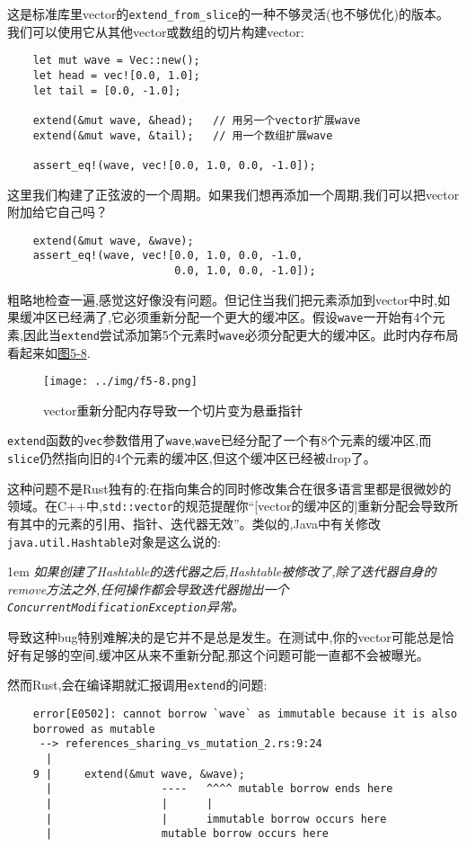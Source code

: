 这是标准库里vector的\texttt{extend\_from\_slice}的一种不够灵活(也不够优化)的版本。我们可以使用它从其他vector或数组的切片构建vector:
\begin{verbatim}
    let mut wave = Vec::new();
    let head = vec![0.0, 1.0];
    let tail = [0.0, -1.0];

    extend(&mut wave, &head);   // 用另一个vector扩展wave
    extend(&mut wave, &tail);   // 用一个数组扩展wave

    assert_eq!(wave, vec![0.0, 1.0, 0.0, -1.0]);
\end{verbatim}

这里我们构建了正弦波的一个周期。如果我们想再添加一个周期,我们可以把vector附加给它自己吗？
\begin{verbatim}
    extend(&mut wave, &wave);
    assert_eq!(wave, vec![0.0, 1.0, 0.0, -1.0,
                          0.0, 1.0, 0.0, -1.0]);
\end{verbatim}

粗略地检查一遍,感觉这好像没有问题。但记住当我们把元素添加到vector中时,如果缓冲区已经满了,它必须重新分配一个更大的缓冲区。假设\texttt{wave}一开始有4个元素,因此当\texttt{extend}尝试添加第5个元素时\texttt{wave}必须分配更大的缓冲区。此时内存布局看起来如\hyperref[f5-8]{图5-8}.

\begin{figure}[htbp]
    \centering
    \texttt{[image: ../img/f5-8.png]}
    \caption{vector重新分配内存导致一个切片变为悬垂指针}
    \label{f5-8}
\end{figure}

\texttt{extend}函数的\texttt{vec}参数借用了\texttt{wave},\texttt{wave}已经分配了一个有8个元素的缓冲区,而\texttt{slice}仍然指向旧的4个元素的缓冲区,但这个缓冲区已经被drop了。

这种问题不是Rust独有的:在指向集合的同时修改集合在很多语言里都是很微妙的领域。在C++中,\texttt{std::vector}的规范提醒你“[vector的缓冲区的]重新分配会导致所有其中的元素的引用、指针、迭代器无效”。类似的,Java中有关修改\texttt{java.util.Hashtable}对象是这么说的:

\hangindent 1em
\noindent
\emph{如果创建了Hashtable的迭代器之后,Hashtable被修改了,除了迭代器自身的remove方法之外,任何操作都会导致迭代器抛出一个\texttt{ConcurrentModificationException}异常。}

导致这种bug特别难解决的是它并不是总是发生。在测试中,你的vector可能总是恰好有足够的空间,缓冲区从来不重新分配,那这个问题可能一直都不会被曝光。

然而Rust,会在编译期就汇报调用\texttt{extend}的问题:
\begin{verbatim}
    error[E0502]: cannot borrow `wave` as immutable because it is also
    borrowed as mutable
     --> references_sharing_vs_mutation_2.rs:9:24
      |
    9 |     extend(&mut wave, &wave);
      |                 ----   ^^^^ mutable borrow ends here
      |                 |      |
      |                 |      immutable borrow occurs here
      |                 mutable borrow occurs here
\end{verbatim}

